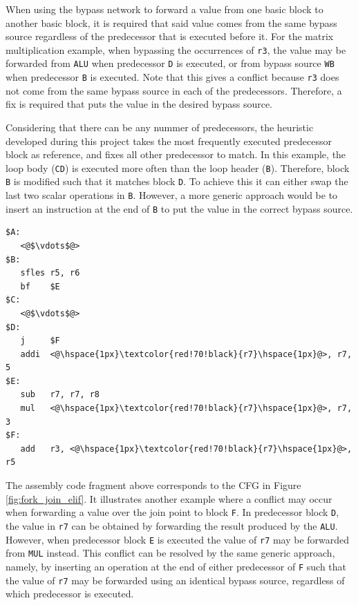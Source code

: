When using the bypass network to forward a value from one basic block to another basic block, it is required that said value comes from the same bypass source regardless of the predecessor that is executed before it. For the matrix multiplication example, when bypassing the occurrences of \texttt{r3}, the value may be forwarded from \texttt{ALU} when predecessor \texttt{D} is executed, or from bypass source \texttt{WB} when predecessor \texttt{B} is executed. Note that this gives a conflict because \texttt{r3} does not come from the same bypass source in each of the predecessors. Therefore, a fix is required that puts the value in the desired bypass source. 

Considering that there can be any nummer of predecessors, the heuristic developed during this project takes the most frequently executed predecessor block as reference, and fixes all other predecessor to match. In this example, the loop body (\texttt{CD}) is executed more often than the loop header (\texttt{B}). Therefore, block \texttt{B} is modified such that it matches block \texttt{D}. To achieve this it can either swap the last two scalar operations in \texttt{B}. However, a more generic approach would be to insert an instruction at the end of \texttt{B} to put the value in the correct bypass source.

\begin{lstlisting}
$A:
   <@$\vdots$@>
$B:
   sfles r5, r6
   bf    $E
$C:
   <@$\vdots$@>
$D:
   j     $F
   addi  <@\hspace{1px}\textcolor{red!70!black}{r7}\hspace{1px}@>, r7, 5
$E:
   sub   r7, r7, r8
   mul   <@\hspace{1px}\textcolor{red!70!black}{r7}\hspace{1px}@>, r7, 3
$F:
   add   r3, <@\hspace{1px}\textcolor{red!70!black}{r7}\hspace{1px}@>, r5
\end{lstlisting}

The assembly code fragment above corresponds to the CFG in Figure \ref{fig:fork_join_elif}. It illustrates another example where a conflict may occur when forwarding a value over the join point to block \texttt{F}. In predecessor block \texttt{D}, the value in \texttt{r7} can be obtained by forwarding the result produced by the \texttt{ALU}. However, when predecessor block \texttt{E} is executed the value of \texttt{r7} may be forwarded from \texttt{MUL} instead. This conflict can be resolved by the same generic approach, namely, by inserting an operation at the end of either predecessor of \texttt{F} such that the value of \texttt{r7} may be forwarded using an identical bypass source, regardless of which predecessor is executed.
